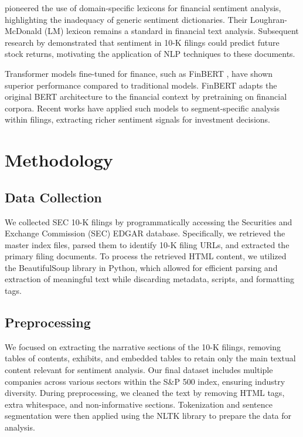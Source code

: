\documentclass[12pt]{article}
\begin{document}
\citet{Loughran2011} pioneered the use of domain-specific lexicons for financial sentiment analysis, highlighting the inadequacy of generic sentiment dictionaries. Their Loughran-McDonald (LM) lexicon remains a standard in financial text analysis. Subsequent research by \citet{Li2010} demonstrated that sentiment in 10-K filings could predict future stock returns, motivating the application of NLP techniques to these documents.

Transformer models fine-tuned for finance, such as FinBERT \citep{Araci2019}, have shown superior performance compared to traditional models. FinBERT adapts the original BERT architecture to the financial context by pretraining on financial corpora. Recent works \citep{Huang2020} have applied such models to segment-specific analysis within filings, extracting richer sentiment signals for investment decisions.

\section{Methodology}
\subsection{Data Collection}
We collected SEC 10-K filings by programmatically accessing the Securities and Exchange Commission (SEC) EDGAR database. Specifically, we retrieved the master index files, parsed them to identify 10-K filing URLs, and extracted the primary filing documents. To process the retrieved HTML content, we utilized the BeautifulSoup library in Python, which allowed for efficient parsing and extraction of meaningful text while discarding metadata, scripts, and formatting tags.

\subsection{Preprocessing}
We focused on extracting the narrative sections of the 10-K filings, removing tables of contents, exhibits, and embedded tables to retain only the main textual content relevant for sentiment analysis. Our final dataset includes multiple companies across various sectors within the S\&P 500 index, ensuring industry diversity. During preprocessing, we cleaned the text by removing HTML tags, extra whitespace, and non-informative sections. Tokenization and sentence segmentation were then applied using the NLTK library to prepare the data for analysis.

\end{document}
